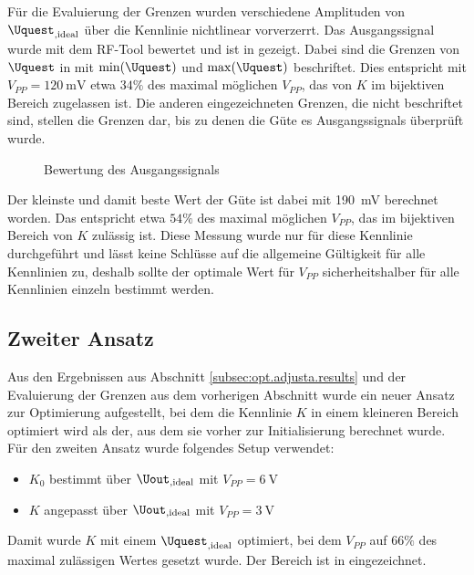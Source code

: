 \documentclass[../Report.tex]{subfiles}
\begin{document}
\noindent
Für die Evaluierung der Grenzen wurden verschiedene Amplituden von $\Uquest_{,\textrm{ideal}}$ über die Kennlinie nichtlinear vorverzerrt. Das Ausgangssignal wurde mit dem RF-Tool \cite{RF-Tool} bewertet und ist in  gezeigt. Dabei sind die Grenzen von $\Uquest$ in  mit $\min(\Uquest)$ und $\max(\Uquest)$ beschriftet. Dies entspricht mit $V_{PP} = \SI{120}{\mV}$ etwa $34\%$ des maximal möglichen $V_{PP}$, das von $K$ im bijektiven Bereich zugelassen ist. Die anderen eingezeichneten Grenzen, die nicht beschriftet sind, stellen die Grenzen dar, bis zu denen die Güte es Ausgangssignals überprüft wurde.\\
\begin{figure}[H]
\begin{subfigure}{0.5 \textwidth}
	\setlength\figureheight{7.5cm}
	\setlength\figurewidth{7.5cm}
    	
	\label{fig:K0_quality}
\end{subfigure}
\begin{subfigure}{0.5 \textwidth}
	\setlength\figureheight{7.5cm}
	\setlength\figurewidth{7.5cm}
    	
	\label{fig:evaluateK.quality}
\end{subfigure}
\caption{Bewertung des Ausgangssignals}
\label{fig:evaluateK}
\end{figure}

\noindent
Der kleinste und damit beste Wert der Güte ist dabei mit \SI{190}{\mV} berechnet worden. Das entspricht etwa $54\%$ des maximal möglichen $V_{PP}$, das im bijektiven Bereich von $K$ zulässig ist. Diese Messung wurde nur für diese Kennlinie durchgeführt und lässt keine Schlüsse auf die allgemeine Gültigkeit für alle Kennlinien zu, deshalb sollte der optimale Wert für $V_{PP}$ sicherheitshalber für alle Kennlinien einzeln bestimmt werden.

\subsection{Zweiter Ansatz}
\label{subsubsec:opt.adjusta.kleiner}
Aus den Ergebnissen aus Abschnitt \ref{subsec:opt.adjusta.results} und der Evaluierung der Grenzen aus dem vorherigen Abschnitt wurde ein neuer Ansatz zur Optimierung aufgestellt, bei dem die Kennlinie $K$ in einem kleineren Bereich optimiert wird als der, aus dem sie vorher zur Initialisierung berechnet wurde.\\
Für den zweiten Ansatz wurde folgendes Setup verwendet:
\begin{itemize}
	\item $K_0$ bestimmt über $\Uout_{,\textrm{ideal}}$ mit $V_{PP} = \SI{6}{\V}$
	\item $K$ angepasst über $\Uout_{,\textrm{ideal}}$ mit $V_{PP} = \SI{3}{\V}$
\end{itemize}
Damit wurde $K$ mit einem $\Uquest_{,\textrm{ideal}}$ optimiert, bei dem $V_{PP}$ auf $66\%$ des maximal zulässigen Wertes gesetzt wurde. Der Bereich ist in  eingezeichnet.
\end{document}
